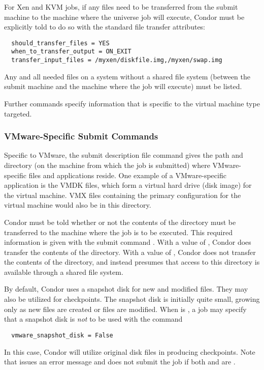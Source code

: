 For Xen and KVM jobs, if any files need to be transferred from the submit machine
to the machine where the  universe job will execute, 
Condor must be explicitly told to do so with the 
standard file transfer attributes:
\footnotesize
\begin{verbatim}
  should_transfer_files = YES
  when_to_transfer_output = ON_EXIT
  transfer_input_files = /myxen/diskfile.img,/myxen/swap.img
\end{verbatim}
\normalsize
Any and all needed files on a system without a shared file
system (between the submit machine and the machine where the
job will execute) must be listed.

Further commands specify information that is specific to the
virtual machine type targeted.

\subsubsection{\label{sec:vm-VMwaresubmitfile}VMware-Specific Submit Commands}

Specific to VMware, the submit description file command
 gives the path and directory
(on the machine from which the job is submitted)
where VMware-specific files and applications reside.
One example of a VMware-specific application is the VMDK files,
which form a virtual hard drive (disk image) for the virtual machine.
VMX files containing the primary configuration for the virtual
machine would also be in this directory.

Condor must be told whether or not the contents of the 
directory must be transferred to the machine where the job is
to be executed.
This required information is given with the submit command
.
With a value of ,
Condor does transfer the contents of the directory.
With a value of ,
Condor does not transfer the contents of the directory,
and instead presumes that access to this directory is
available through a shared file system.

By default, Condor uses a snapshot disk for new and modified files.
They may also be utilized for checkpoints.
The snapshot disk is initially quite small,
growing only as new files are created or files are modified.
When  is ,
a job may specify that a snapshot disk is \emph{not} to be
used with the command
\begin{verbatim}
  vmware_snapshot_disk = False
\end{verbatim}
In this case, Condor will utilize original disk files in producing
checkpoints. 
Note that  issues an error message and does not
submit the job if both 
and  are .

